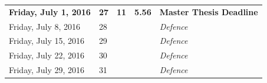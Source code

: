 \documentclass{../resources/acm_proc_article-sp}
\begin{document}
\begin{table}[]
{\begin{tabular}{llcll}
\textbf{Friday, July 1, 2016} & \textbf{27}   & \textbf{11}                  & \textbf{5.56}                  & \textbf{Master Thesis Deadline}                                                                   \\
Friday, July 8, 2016          & 28            & \textbf{}                    &                                & \textit{Defence}                                                                                  \\
Friday, July 15, 2016         & 29            & \textbf{}                    &                                & \textit{Defence}                                                                                  \\
Friday, July 22, 2016         & 30            & \textbf{}                    &                                & \textit{Defence}                                                                                  \\
Friday, July 29, 2016         & 31            & \textbf{}                    &                                & \textit{Defence}                                                                                  \\ \hline
\end{tabular}
}
\end{table}
\end{document}
